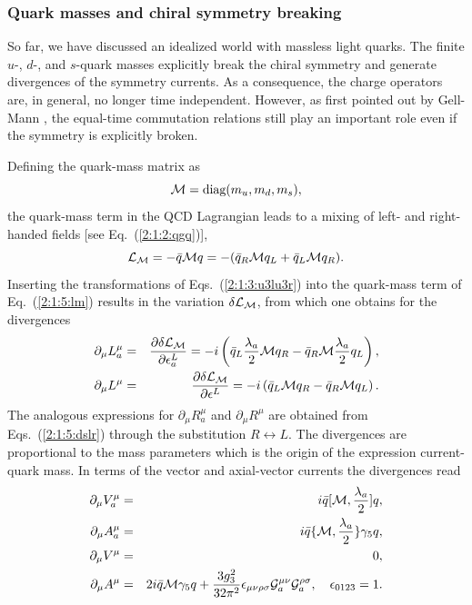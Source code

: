 \documentclass[twoside,12pt]{article}
\begin{document}
\subsubsection{Quark masses and chiral symmetry breaking}
\label{subsec_csbdqm}
   So far, we have discussed an idealized world with massless light quarks.
   The finite $u$-, $d$-, and $s$-quark masses explicitly break the chiral symmetry and
generate divergences of the symmetry currents.
   As a consequence, the charge operators are, in general, no longer
time independent.
   However, as first pointed out by Gell-Mann \cite{Gell-Mann:xb:3:5}, the equal-time commutation
relations still play an important role even if the symmetry is
explicitly broken.

   Defining the quark-mass matrix as
\begin{displaymath}
{\cal M}=\mbox{diag}(m_u,m_d,m_s),
\end{displaymath}
   the quark-mass term in the QCD Lagrangian leads to a mixing
of left- and right-handed fields [see Eq.~(\ref{2:1:2:qgq})],
\begin{equation}
\label{2:1:5:lm} {\cal L}_{\cal M}= -\bar{q}{\cal M}q= -(\bar{q}_R
{\cal M} q_L +\bar{q}_L {\cal M} q_R).
\end{equation}
   Inserting the transformations of Eqs.~(\ref{2:1:3:u3lu3r}) into
the quark-mass term of Eq.~(\ref{2:1:5:lm}) results in the variation
$\delta{\cal L}_{\cal M}$, from which one obtains for the divergences
\begin{eqnarray}
\label{2:1:5:dslr}
\partial_\mu L^{\mu}_a&=&\frac{\partial \delta {\cal L}_{\cal M}}{\partial \epsilon^L_a}
=-i\left(\bar{q}_L\frac{\lambda_a}{2}{\cal M} q_R -\bar{q}_R {\cal
M} \frac{\lambda_a}{2}
q_L\right),\nonumber\\
\partial_\mu L^{\mu}&=&\frac{\partial \delta {\cal L}_{\cal M}}{\partial \epsilon^L}
=-i\left(\bar{q}_L {\cal M} q_R -\bar{q}_R {\cal M} q_L\right).
\end{eqnarray}
   The analogous expressions for $\partial_\mu R^{\mu}_a$ and
$\partial_\mu R^{\mu}$ are obtained from Eqs.~(\ref{2:1:5:dslr}) through the substitution
$R\leftrightarrow L$.
   The divergences are proportional to the mass parameters which is
the origin of the expression current-quark mass.
   In terms of the vector and axial-vector currents the divergences read
\begin{eqnarray}
\label{2:1:5:dsva}
\partial_\mu V^{\mu}_a&=&
i\bar{q}[{\cal M},\frac{\lambda_a}{2}]q,\nonumber\\
\partial_\mu A^{\mu}_a&=&
i\bar{q}\{{\cal M},\frac{\lambda_a}{2}\}\gamma_5q,\nonumber\\
\partial_\mu V^\mu&=&0,\nonumber\\
\partial_\mu A^\mu&=&2i\bar{q}{\cal M}\gamma_5 q+
\frac{3 g^2_3}{32\pi^2}\epsilon_{\mu\nu\rho\sigma} {\cal G}^{\mu\nu}_a
{\cal G}^{\rho\sigma}_a,\quad \epsilon_{0123}=1.
\end{eqnarray}
\end{document}
